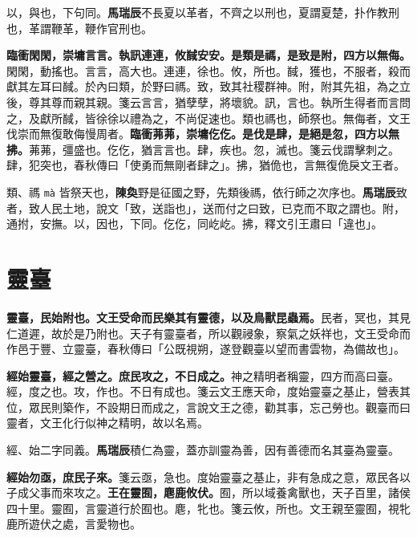 \begin{quoting}以，與也，下句同。\textbf{馬瑞辰}不長夏以革者，不齊之以刑也，夏謂夏楚，扑作教刑也，革謂鞭革，鞭作官刑也。\end{quoting}

\textbf{臨衝閑閑，崇墉言言。執訊連連，攸馘安安。是類是禡，是致是附，四方以無侮。}{\footnotesize 閑閑，動搖也。言言，高大也。連連，徐也。攸，所也。馘，獲也，不服者，殺而獻其左耳曰馘。於內曰類，於野曰禡。致，致其社稷群神。附，附其先祖，為之立後，尊其尊而親其親。箋云言言，猶孽孽，將壞貌。訊，言也。執所生得者而言問之，及獻所馘，皆徐徐以禮為之，不尚促速也。類也禡也，師祭也。無侮者，文王伐崇而無復敢侮慢周者。}\textbf{臨衝茀茀，崇墉仡仡。是伐是肆，是絕是忽，四方以無拂。}{\footnotesize 茀茀，彊盛也。仡仡，猶言言也。肆，疾也。忽，滅也。箋云伐謂擊刺之。肆，犯突也，春秋傳曰「使勇而無剛者肆之」。拂，猶佹也，言無復佹戾文王者。}

\begin{quoting}類、禡 \texttt{mà} 皆祭天也，\textbf{陳奐}野是征國之野，先類後禡，依行師之次序也。\textbf{馬瑞辰}致者，致人民土地，說文「致，送詣也」，送而付之曰致，已克而不取之謂也。附，通拊，安撫。以，因也，下同。仡仡，同屹屹。拂，釋文引王肅曰「違也」。\end{quoting}

\section{靈臺}


\textbf{靈臺，民始附也。文王受命而民樂其有靈德，以及鳥獸昆蟲焉。}{\footnotesize 民者，冥也，其見仁道遲，故於是乃附也。天子有靈臺者，所以觀祲象，察氣之妖祥也，文王受命而作邑于豐、立靈臺，春秋傳曰「公既視朔，遂登觀臺以望而書雲物，為備故也」。}

\textbf{經始靈臺，經之營之。庶民攻之，不日成之。}{\footnotesize 神之精明者稱靈，四方而高曰臺。經，度之也。攻，作也。不日有成也。箋云文王應天命，度始靈臺之基止，營表其位，眾民則築作，不設期日而成之，言說文王之德，勸其事，忘己勞也。觀臺而曰靈者，文王化行似神之精明，故以名焉。}

\begin{quoting}經、始二字同義。\textbf{馬瑞辰}積仁為靈，蓋亦訓靈為善，因有善德而名其臺為靈臺。\end{quoting}

\textbf{經始勿亟，庶民子來。}{\footnotesize 箋云亟，急也。度始靈臺之基止，非有急成之意，眾民各以子成父事而來攻之。}\textbf{王在靈囿，麀鹿攸伏。}{\footnotesize 囿，所以域養禽獸也，天子百里，諸侯四十里。靈囿，言靈道行於囿也。麀，牝也。箋云攸，所也。文王親至靈囿，視牝鹿所遊伏之處，言愛物也。}

